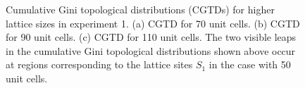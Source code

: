 \documentclass[fleqn,10pt]{wlscirep}
\begin{document}
\begin{figure}
\centering
{}
\caption{Cumulative Gini topological distributions (CGTDs) for higher lattice sizes in experiment 1. (a) CGTD for 70 unit cells. (b) CGTD for 90 unit cells. (c) CGTD for 110 unit cells. The two visible leaps in the cumulative Gini topological distributions shown above occur at regions corresponding to the lattice sites $S_1$ in the case with 50 unit cells.}
\label{cdf1}
\end{figure}
\end{document}
